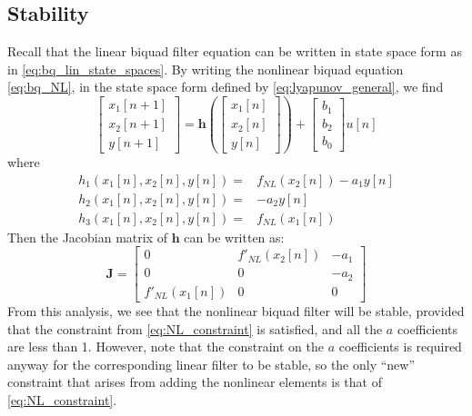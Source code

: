 \documentclass{IEEEtran}
\begin{document}
\subsection{Stability}
%
Recall that the linear biquad filter equation can be written
in state space form as in \cref{eq:bq_lin_state_spaces}. By
writing the nonlinear biquad equation \cref{eq:bq_NL}, in
the state space form defined by \cref{eq:lyapunov_general},
we find
%
\begin{equation}
    \begin{bmatrix} x_1[n+1] \\ x_2[n+1] \\ y[n+1] \end{bmatrix} =
    \mathbf{h} \left( \begin{bmatrix} x_1[n] \\ x_2[n] \\ y[n] \end{bmatrix}
    \right) + \begin{bmatrix} b_1\\ b_2\\ b_0 \end{bmatrix} u[n]
    \label{eq:nlbq_states}
\end{equation}
%
where
%
\begin{equation}
    \begin{split}
        h_1(x_1[n], x_2[n], y[n]) =& f_{NL}(x_2[n]) - a_1y[n] \\
        h_2(x_1[n], x_2[n], y[n]) =& -a_2y[n] \\
        h_3(x_1[n], x_2[n], y[n]) =& f_{NL}(x_1[n])
    \end{split}
    \label{eq:nlbq_state_eqns}
\end{equation}
%
Then the Jacobian matrix of $\mathbf{h}$ can be written as:
%
\begin{equation}
    \mathbf{J} = \begin{bmatrix}
        0& f'_{NL}(x_2[n])& -a_1 \\
        0& 0& -a_2 \\
        f'_{NL}(x_1[n])& 0& 0
    \end{bmatrix}
    \label{eq:nlbq_Jacobian}
\end{equation}
%
From this analysis, we see that the nonlinear biquad filter will be
stable, provided that the constraint from \cref{eq:NL_constraint}
is satisfied, and all the $a$ coefficients are less than 1. However,
note that the constraint on the $a$ coefficients is required
anyway for the corresponding linear filter to be stable, so the
only ``new'' constraint that arises from adding the nonlinear
elements is that of \cref{eq:NL_constraint}.
\end{document}
